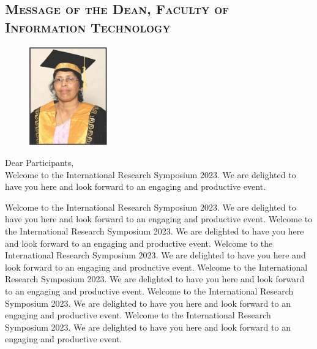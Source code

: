 \thispagestyle{fancy}
	
	\vspace{-2em} %
	\begin{center}



\subsection*{\textsc{Message of the Dean, Faculty of Information Technology}}
	\end{center}

   
    
    \begin{figure}
		\includegraphics[width=0.3\textwidth]{Images/DeanICT.jpeg}
	\end{figure}
	\vspace{2em} %




	
	\noindent	Dear Participants,\\
	
	\noindent
	Welcome to the International Research Symposium 2023. We are delighted to have you here and look forward to an engaging and productive event. 
	
	Welcome to the International Research Symposium 2023. We are delighted to have you here and look forward to an engaging and productive event. Welcome to the International Research Symposium 2023. We are delighted to have you here and look forward to an engaging and productive event. Welcome to the International Research Symposium 2023. We are delighted to have you here and look forward to an engaging and productive event. Welcome to the International Research Symposium 2023. We are delighted to have you here and look forward to an engaging and productive event. Welcome to the International Research Symposium 2023. We are delighted to have you here and look forward to an engaging and productive event. Welcome to the International Research Symposium 2023. We are delighted to have you here and look forward to an engaging and productive event. 
	
